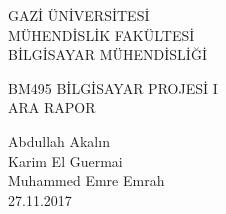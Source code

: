 \renewcommand{\abstractname}{Özet}
\begin{titlepage}
    \begin{center}
        \begin{large}
            \vspace*{0.5cm}
            GAZİ ÜNİVERSİTESİ \\
            MÜHENDİSLİK FAKÜLTESİ \\
            BİLGİSAYAR MÜHENDİSLİĞİ

            \vfill
            BM495 BİLGİSAYAR PROJESİ I \\
            ARA RAPOR
            
            \vfill
            Abdullah Akalın\\Karim El Guermai\\Muhammed Emre Emrah\\

            \vfill
            \vspace{0.5cm}
            27.11.2017
        \end{large}
    \end{center}
\end{titlepage}
